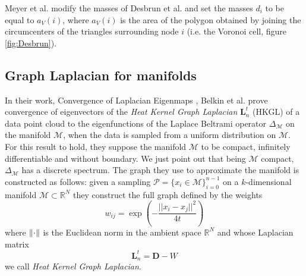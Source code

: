 Meyer et al. \cite{Meyer02discretedifferential-geometry} modify the masses of Desbrun et al. and set the masses $d_i$ to be equal to $a_{V}(i)$, where \(a_{V}(i)\) is the area of the polygon obtained by joining the circumcenters of the triangles surrounding node $i$ (i.e. the Voronoi cell, figure \ref{fig:Desbrun}).
\subsection{Graph Laplacian for manifolds}\label{sec:Chapter1:theoretical foundations}
In their work, Convergence of Laplacian Eigenmaps \cite{NIPS2006_2989}, Belkin et al. prove convergence of eigenvectors of the \textit{Heat Kernel Graph Laplacian} $\mathbf L_n^t$ (HKGL) of a data point cloud to the eigenfunctions of the Laplace Beltrami operator $\Delta_\mathcal M$ on the manifold $\mathcal M$, when the data is sampled from a uniform distribution on $\mathcal M$.
For this result to hold, they suppose the manifold $\mathcal M$ to be compact, infinitely differentiable and without boundary. We just point out that being $\mathcal M$ compact, $\Delta_\mathcal M$ has a discrete spectrum. The graph they use to approximate the manifold is constructed as follows: given a sampling $ \mathcal P = \{x_i\in\mathcal M\}_{i=0}^{n-1}$ on a $k$-dimensional manifold $\mathcal M\subset \mathbb R^N$ they construct the full graph defined by the weights 
$$
w_{ij}=\exp\left({-\frac{||x_i-x_j||^2}{4t}}\right)
$$
where $\left\lVert\cdot\right\rVert$ is the Euclidean norm in the ambient space $\mathbb R^N$ and whose Laplacian matrix 
$$
\mathbf L_n^t = \mathbf D-W
$$ we call \textit{Heat Kernel Graph Laplacian}.

